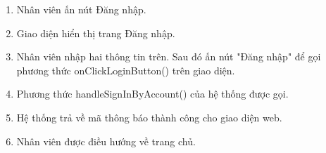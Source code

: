 \begin{enumerate}
	\item Nhân viên ấn nút Đăng nhập.
	\item Giao diện hiển thị trang Đăng nhập.
	
		\item Nhân viên nhập hai thông tin trên. Sau đó ấn nút "Đăng nhập" để gọi phương thức onClickLoginButton() trên giao diện. 
		\item Phương thức handleSignInByAccount() của hệ thống được gọi.
		\item Hệ thống trả về mã thông báo thành công cho giao diện web.
		\item Nhân viên được điều hướng về trang chủ.
	
\end{enumerate}

